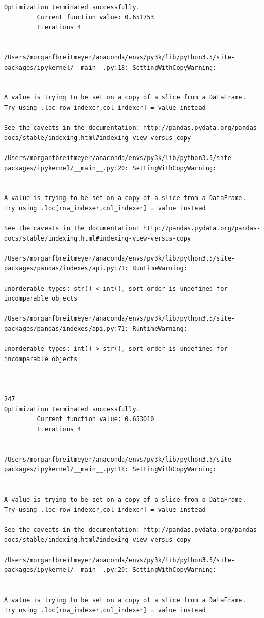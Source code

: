 \begin{lstlisting}
Optimization terminated successfully.
         Current function value: 0.651753
         Iterations 4


/Users/morganfbreitmeyer/anaconda/envs/py3k/lib/python3.5/site-packages/ipykernel/__main__.py:18: SettingWithCopyWarning:


A value is trying to be set on a copy of a slice from a DataFrame.
Try using .loc[row_indexer,col_indexer] = value instead

See the caveats in the documentation: http://pandas.pydata.org/pandas-docs/stable/indexing.html#indexing-view-versus-copy

/Users/morganfbreitmeyer/anaconda/envs/py3k/lib/python3.5/site-packages/ipykernel/__main__.py:20: SettingWithCopyWarning:


A value is trying to be set on a copy of a slice from a DataFrame.
Try using .loc[row_indexer,col_indexer] = value instead

See the caveats in the documentation: http://pandas.pydata.org/pandas-docs/stable/indexing.html#indexing-view-versus-copy

/Users/morganfbreitmeyer/anaconda/envs/py3k/lib/python3.5/site-packages/pandas/indexes/api.py:71: RuntimeWarning:

unorderable types: str() < int(), sort order is undefined for incomparable objects

/Users/morganfbreitmeyer/anaconda/envs/py3k/lib/python3.5/site-packages/pandas/indexes/api.py:71: RuntimeWarning:

unorderable types: int() > str(), sort order is undefined for incomparable objects



247
Optimization terminated successfully.
         Current function value: 0.653010
         Iterations 4


/Users/morganfbreitmeyer/anaconda/envs/py3k/lib/python3.5/site-packages/ipykernel/__main__.py:18: SettingWithCopyWarning:


A value is trying to be set on a copy of a slice from a DataFrame.
Try using .loc[row_indexer,col_indexer] = value instead

See the caveats in the documentation: http://pandas.pydata.org/pandas-docs/stable/indexing.html#indexing-view-versus-copy

/Users/morganfbreitmeyer/anaconda/envs/py3k/lib/python3.5/site-packages/ipykernel/__main__.py:20: SettingWithCopyWarning:


A value is trying to be set on a copy of a slice from a DataFrame.
Try using .loc[row_indexer,col_indexer] = value instead


\end{lstlisting}
